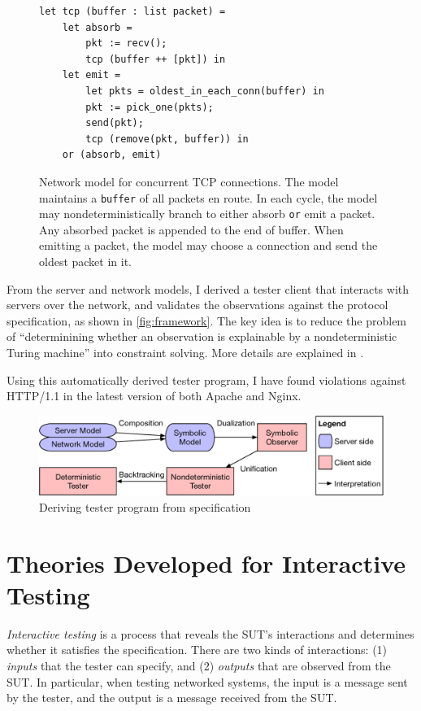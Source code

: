 \documentclass{article}
\newcommand{\ilc}[1]{\lstinline[style=customcoq]{#1}}
\theoremstyle{definition}
\begin{document}
\begin{figure}
\begin{lstlisting}[style=customcoq]
let tcp (buffer : list packet) =
    let absorb =
        pkt := recv();
        tcp (buffer ++ [pkt]) in
    let emit =
        let pkts = oldest_in_each_conn(buffer) in
        pkt := pick_one(pkts);
        send(pkt);
        tcp (remove(pkt, buffer)) in
    or (absorb, emit)
\end{lstlisting}
\caption{Network model for concurrent TCP connections.  The model maintains a
  \ilc{buffer} of all packets en route.  In each cycle, the model may
  nondeterministically branch to either absorb \ilc{or} emit a packet.  Any
  absorbed packet is appended to the end of buffer.  When emitting a packet, the
  model may choose a connection and send the oldest packet in it.  }
\label{fig:tcp-model}
\end{figure}

From the server and network models, I derived a tester client that interacts
with servers over the network, and validates the observations against the
protocol specification, as shown in \autoref{fig:framework}.  The key idea is to
reduce the problem of ``determinining whether an observation is explainable by a
nondeterministic Turing machine'' into constraint solving.  More details are
explained in \textcite{issta21}.

Using this automatically derived tester program, I have found violations against
HTTP/1.1 in the latest version of both Apache and Nginx.

\begin{figure}
  \includegraphics[width=\linewidth]{figures/framework}
  \caption{Deriving tester program from specification}
  \label{fig:framework}
\end{figure}

\section{Theories Developed for Interactive Testing}
{\em Interactive testing} is a process that reveals the SUT's interactions and
determines whether it satisfies the specification.  There are two kinds of
interactions: (1) {\em inputs} that the tester can specify, and (2) {\em
  outputs} that are observed from the SUT.  In particular, when testing
networked systems, the input is a message sent by the tester, and the output is
a message received from the SUT.
\end{document}
